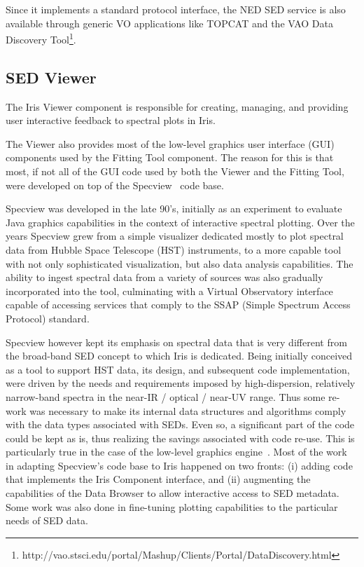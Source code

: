 \documentclass[5p]{elsarticle}
\begin{document}
Since it implements a standard protocol interface, the NED SED service is also available through generic VO applications like TOPCAT and the VAO Data Discovery Tool\footnote{http://vao.stsci.edu/portal/Mashup/Clients/Portal/DataDiscovery.html}.

\subsection{SED Viewer}
\label{subsec:specview}
The Iris Viewer component is responsible for creating, managing, and providing user interactive feedback to spectral plots in Iris.

The Viewer also provides most of the low-level graphics user interface (GUI) components used by the Fitting Tool component. The reason for this is that most, if not all of the GUI code used by both the Viewer and the Fitting Tool, were developed on top of the Specview~\citep{2002ASPC..281..120B} code base.

Specview was developed in the late 90's, initially as an experiment to evaluate Java graphics capabilities in the context of interactive spectral plotting. Over the years Specview grew from a simple visualizer dedicated mostly to plot spectral data from Hubble Space Telescope (HST) instruments, to a more capable tool with not only sophisticated visualization, but also data analysis capabilities. The ability to ingest spectral data from a variety of sources was also gradually incorporated into the tool, culminating with a Virtual Observatory interface capable of accessing services that comply to the SSAP (Simple Spectrum Access Protocol) standard.

Specview however kept its emphasis on spectral data that is very different from the broad-band SED concept to which Iris is dedicated. Being initially conceived as a tool to support HST data, its design, and subsequent code implementation, were driven by the needs and requirements imposed by high-dispersion, relatively narrow-band spectra in the near-IR / optical / near-UV range. Thus some re-work was necessary to make its internal data structures and algorithms comply with the data types associated with SEDs. Even so, a significant part of the code could be kept as is, thus realizing the savings associated with code re-use. This is particularly true in the case of the low-level graphics engine~\citep{2000ASPC..216...79B}. Most of the work in adapting Specview's code base to Iris happened on two fronts: (i) adding code that implements the Iris Component interface, and (ii) augmenting the capabilities of the Data Browser to allow interactive access to SED metadata. Some work was also done in fine-tuning plotting capabilities to the particular needs of SED data.
\end{document}
